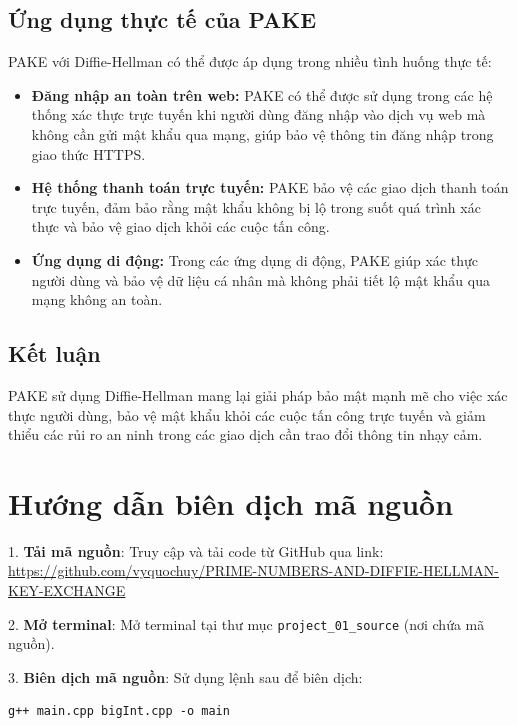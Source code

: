 \documentclass[a4paper,12pt]{article}
\begin{document}
\subsection{Ứng dụng thực tế của PAKE}
PAKE với Diffie-Hellman có thể được áp dụng trong nhiều tình huống thực tế:
\begin{itemize}
    \item \textbf{Đăng nhập an toàn trên web:} PAKE có thể được sử dụng trong các hệ thống xác thực trực tuyến khi người dùng đăng nhập vào dịch vụ web mà không cần gửi mật khẩu qua mạng, giúp bảo vệ thông tin đăng nhập trong giao thức HTTPS.
    \item \textbf{Hệ thống thanh toán trực tuyến:} PAKE bảo vệ các giao dịch thanh toán trực tuyến, đảm bảo rằng mật khẩu không bị lộ trong suốt quá trình xác thực và bảo vệ giao dịch khỏi các cuộc tấn công.
    \item \textbf{Ứng dụng di động:} Trong các ứng dụng di động, PAKE giúp xác thực người dùng và bảo vệ dữ liệu cá nhân mà không phải tiết lộ mật khẩu qua mạng không an toàn.
\end{itemize}

\subsection{Kết luận}
PAKE sử dụng Diffie-Hellman mang lại giải pháp bảo mật mạnh mẽ cho việc xác thực người dùng, bảo vệ mật khẩu khỏi các cuộc tấn công trực tuyến và giảm thiểu các rủi ro an ninh trong các giao dịch cần trao đổi thông tin nhạy cảm.

\section{Hướng dẫn biên dịch mã nguồn}

1. \textbf{Tải mã nguồn}: Truy cập và tải code từ GitHub qua link:\\ \href{https://github.com/vyquochuy/PRIME-NUMBERS-AND-DIFFIE-HELLMAN-KEY-EXCHANGE}{https://github.com/vyquochuy/\newline PRIME-NUMBERS-AND-DIFFIE-HELLMAN-KEY-EXCHANGE}



2. \textbf{Mở terminal}: Mở terminal tại thư mục \texttt{project\_01\_source} (nơi chứa mã nguồn).

3. \textbf{Biên dịch mã nguồn}: Sử dụng lệnh sau để biên dịch:
\begin{lstlisting}
g++ main.cpp bigInt.cpp -o main
\end{lstlisting}
\end{document}
